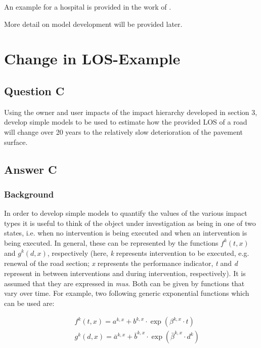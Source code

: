 An example for a hospital is provided in  the work of \cite{Neufville2011} . 

More detail on model development will be provided later.

\section{Change in LOS-Example}

\subsection{Question C}

Using the owner and user impacts of the impact hierarchy developed in section 3, develop simple models to be used to estimate how the provided LOS of a road will change over 20 years to the relatively slow deterioration of the pavement surface. 

\subsection{Answer C}

\subsubsection{Background}

In order to develop simple models to quantify the values of the various impact types it is useful to think of the object under investigation as being in one of two states, i.e. when no intervention is being executed and when an intervention is being executed. In general, these can be represented by the functions $f_{}^k(t,x)$ and $g_{}^k(d,x)$, respectively (here, \textit{k} represents intervention to be executed, e.g. renewal of the road section; \textit{x} represents the performance indicator, \textit{t} and \textit{d} represent in between interventions and during intervention, respectively). It is assumed that they are expressed in \textit{mus}. Both can be given by functions that vary over time. For example, two following generic exponential functions which can be used are: 

\begin{eqnarray}
      && {f^k}(t,x) = {a^{k,x}} + {b^{k,x}} \cdot \exp ({\beta ^{k,x}} \cdot t) \label{fx}\\
      && {g^k}(d,x) = {\bar a^{k,x}} + {\bar b^{k,x}} \cdot \exp ({\bar \beta ^{k,x}} \cdot {d^k}) \label{gx}
\end{eqnarray}


